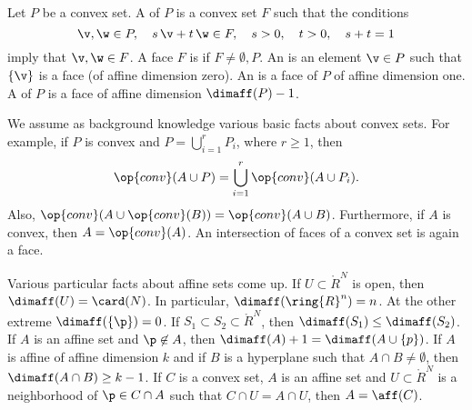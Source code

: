 \begin{definition}
Let $P$ be a convex set.  A  of $P$ is a convex set
$F$ such that the conditions
\begin{displaymath}
\v,\w\in P,\quad s\, \v + t\, \w \in F,\quad s>0,\quad t>0,\quad s+t = 1
\end{displaymath} 
imply that $\v,\w\in F$.  A face $F$ is  if $F\ne
\emptyset,P$.  An  is an element $\v\in P$ such that
$\{\v\}$ is a face (of affine dimension zero).  An   is a face of $P$ of
affine dimension one.  A  of $P$ is a 
face of affine dimension $\dimaff(P)-1$.  %
\end{definition}

\begin{remark}\label{rem:convex-background}
We  assume as background knowledge various basic facts about convex sets.
For example,
if $P$ is convex and $P = \bigcup_{i=1}^r P_i$, where $r\ge 1$, then
\begin{displaymath}
\op{conv}(A\cup P ) = \bigcup_{i=1}^r\op{conv}(A\cup P_i).
\end{displaymath}
Also, $\op{conv}(A\cup \op{conv}(B)) = \op{conv}(A \cup B)$.
Furthermore, if $A$ is convex, then $A = \op{conv}(A)$.
 An intersection of faces of a
convex set is again a face.
\end{remark}


\begin{remark}\label{rem:affine-background}
Various particular facts about affine sets  come up.
If $U\subset\ring{R}^N$ is open, then $\dimaff(U) = \card(N)$.  In particular,
$\dimaff(\ring{R}^n) = n$.  At the other extreme $\dimaff(\{\p\}) = 0$.
If $S_1\subset S_2\subset\ring{R}^N$, then $\dimaff(S_1) \le \dimaff(S_2)$.
If $A$ is an affine set and $\p\not\in A$, then $\dimaff(A) +1 = \dimaff(A\cup\{p\})$.
If $A$ is affine of affine dimension $k$ and if $B$ is a hyperplane such that $A\cap B\ne\emptyset$, then $\dimaff (A\cap B)\ge k-1$.
If $C$ is a convex set, $A$ is an affine set and $U\subset \ring{R}^N$ 
is a neighborhood of $\p\in C\cap A$ such that $C\cap U = A\cap U$, then
$A=\aff(C)$.
\end{remark}


